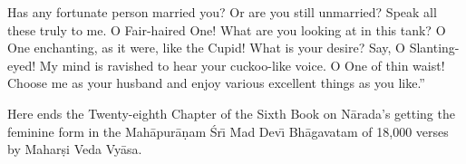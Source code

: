 Has any fortunate person married you? Or are you still unmarried? Speak all these truly to me. O Fair-haired One! What are you looking at in this tank? O One enchanting, as it were, like the Cupid! What is your desire? Say, O Slanting-eyed! My mind is ravished to hear your cuckoo-like voice. O One of thin waist! Choose me as your husband and enjoy various excellent things as you like.''

Here ends the Twenty-eighth Chapter of the Sixth Book on N\=arada's getting the feminine form in the Mah\=apur\=a\d{n}am \'Sr\={\i} Mad Dev\={\i} Bh\=agavatam of 18,000 verses by Mahar\d{s}i Veda Vy\=asa.



